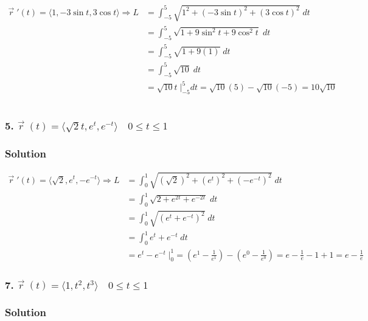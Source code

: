 \documentclass{article}
\begin{document}
\begin{align*}
    \vec{r}\;'(t) = \langle{1, -3\sin{t}, 3\cos{t}} \rangle \Rightarrow
    L &= \int_{-5}^{5} \sqrt{1^2 + (-3\sin{t})^2 + (3\cos t)^2}\;dt \\
    &= \int_{-5}^{5} \sqrt{1 + 9\sin^2t + 9\cos^2t}\; dt\\ 
    &= \int_{-5}^{5} \sqrt{1 + 9(1)}\; dt \\
    &= \int_{-5}^{5} \sqrt{10}\; dt \\ 
    &= \sqrt{10}t\; \Big|_{-5}^{5} dt = \sqrt{10}(5) - \sqrt{10}(-5) = 10\sqrt{10}
\end{align*}


\[
\]

\subsubsection*{5. $\vec{r}\;(t) = \langle{\sqrt{2}t, e^{t}, e^{-t}} \rangle \quad 0 \leq t \leq 1$}
\subsubsection*{Solution}

\begin{align*}
    \vec{r}\; '(t) = \langle{\sqrt{2}, e^{t}, -e^{-t}} \rangle \Rightarrow
    L &= \int_{0}^{1} \sqrt{(\sqrt{2})^2 + (e^{t})^{2} + (-e^{-t})^{2}}\; dt \\
      &= \int_{0}^{1} \sqrt{2 + e^{2t} + e^{-2t}}\; dt \\ 
      &= \int_{0}^{1} \sqrt{(e^{t} + e^{-t})^2}\; dt \\
      &= \int_{0}^{1} e^{t} + e^{-t}\; dt \\
      &= e^{t} - e^{-t}\; \Big|_{0}^{1} = (e^{1} - \frac{1}{e^1}) - (e^{0} - \frac{1}{e^0}) = e - \frac{1}{e} - 1 + 1 = e - \frac{1}{e}
\end{align*}



\subsubsection*{7. $\vec{r}\;(t) = \langle{1, t^2, t^3} \rangle \quad 0 \leq t \leq 1$}
\subsubsection*{Solution}
\end{document}

